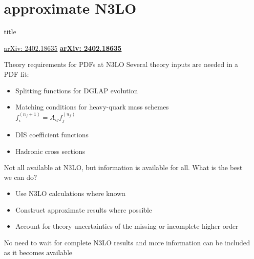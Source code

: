 \documentclass[8pt,t]{beamer}
\newcommand{\SectionTitleFrame}[1][]{%
  \begin{frame}
    \vfill
    \centering
    \begin{beamercolorbox}[sep=8pt,center,shadow=true,rounded=true]{title}
      \usebeamerfont{title}\insertsection\par
    \end{beamercolorbox}
    \ifx\relax#1\relax\else
      \vspace{0.5cm}
      \textbf{#1}
    \fi
    \vfill
  \end{frame}
}
\begin{document}


\section*{approximate N3LO}
\SectionTitleFrame[\hyperlink{https://arxiv.org/abs/2402.18635}{arXiv: 2402.18635}]



\begin{frame}{Theory requirements for PDFs at N3LO}
  Several theory inputs are needed in a PDF fit:
  \begin{itemize}
    \item Splitting functions for DGLAP evolution
    \item Matching conditions for heavy-quark mass schemes \\
    $ f_i^{\left(n_f+1\right)}=A_{i j} f_j^{\left(n_f\right)} $

    \item DIS coefficient functions
    \item Hadronic cross sections
  \end{itemize}

  \vspace*{2em}
  Not all available at N3LO, but information is available for all. What is the best we can do?
  \begin{itemize}
    \item Use N3LO calculations where known
    \item Construct approximate results where possible
    \item Account for theory uncertainties of the missing or incomplete higher order
  \end{itemize}

  \vspace*{1em}
  No need to wait for complete N3LO results and more information can be included as it becomes available
\end{frame}
\end{document}
